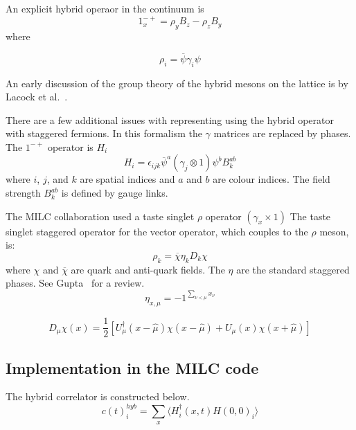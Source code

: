 \documentclass[12pt]{article}
\begin{document}
An explicit hybrid operaor in the continuum is
\begin{equation}
1^{-+}_x = \rho_y B_z - \rho_z  B_y
\end{equation}
where

\begin{equation}
\rho_i = \overline{\psi} \gamma_i \psi
\end{equation}

An early discussion of the group theory of 
the hybrid mesons on the lattice is by
Lacock et al.~\cite{Lacock:1996vy}.

There are a few additional issues with representing using the 
hybrid operator with staggered fermions. In this formalism
the $\gamma$ matrices are replaced by phases.
The $1^{-+}$ operator is $H_i$
\begin{equation}
H_i = \epsilon_{ijk} \overline{\psi}^a (\gamma_j \otimes 1) \psi^b
B_k^{ab}  \label{eq:hybStagg}
\end{equation}
where $i$, $j$, and $k$ are spatial indices and $a$ and $b$ 
are colour indices. The field strength $B_k^{ab}$ is
defined by gauge links.


The MILC collaboration used a taste singlet $\rho$ operator
$(\gamma_x \times  1 )$
The taste singlet staggered operator 
for the vector operator, which couples to the $\rho$ meson, is:
\begin{equation}
\rho_k = \overline{\chi}  \eta_k D_k \chi
\end{equation}
where $\chi$ and $\overline{\chi}$ are quark and anti-quark fields.
The $\eta$ are the standard staggered phases.
See Gupta~\cite{Gupta:1997nd} for a review.
\begin{equation}
\eta_{x,\mu} = -1^{\sum_{\nu < \mu} x_\nu}
\end{equation}


\begin{equation}
D_\mu \chi(x) = \frac{1}{2}
[ U_\mu^\dagger(x - \hat{\mu}) \chi( x - \hat{\mu}) + U_{\mu} (x)
  \chi( x + \hat{\mu}) ]
\end{equation}


\subsection{Implementation in the MILC code}

The hybrid correlator is constructed below.
\begin{equation}
c(t)_i^{hyb}  = \sum_{x} \langle H^{\dagger}_i (x,t)  H(0,0)_i
\rangle
\end{equation}
\end{document}

